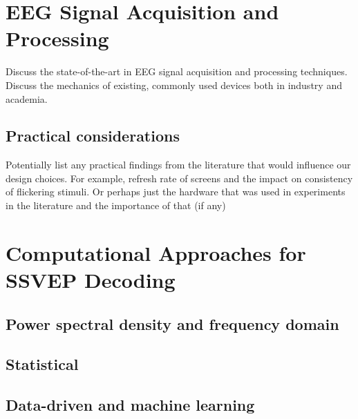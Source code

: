 \section{EEG Signal Acquisition and Processing}
Discuss the state-of-the-art in EEG signal acquisition and processing techniques. Discuss the mechanics of existing, commonly used devices both in industry and academia.


\subsection{Practical considerations}
Potentially list any practical findings from the literature that would influence our design choices. For example, refresh rate of screens and the impact on consistency of flickering stimuli. Or perhaps just the hardware that was used in experiments in the literature and the importance of that (if any)

\section{Computational Approaches for SSVEP Decoding}
\subsection{Power spectral density and frequency domain}
\subsection{Statistical}
\subsection{Data-driven and machine learning}